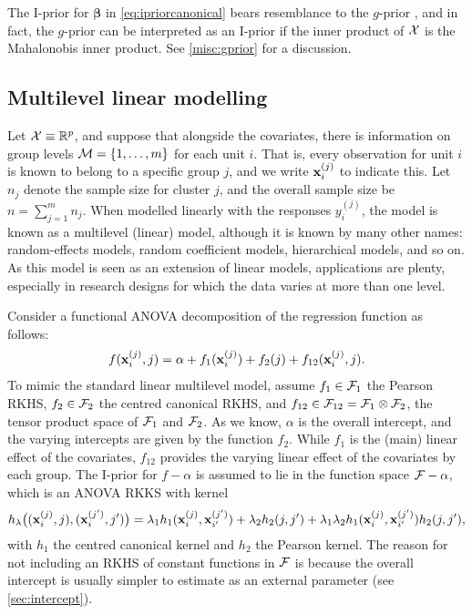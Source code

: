 \begin{remark}
  The I-prior for $\boldsymbol{\beta}$ in \cref{eq:ipriorcanonical} bears resemblance to the $g$-prior \citep{zellner1986assessing}, and in fact, the $g$-prior can be interpreted as an I-prior if the inner product of ${\mathcal X}$ is the Mahalonobis inner product.
  See \cref{misc:gprior}  for a discussion.
\end{remark}

\subsection{Multilevel linear modelling}
\label{sec:multilevelmodels}

Let ${\mathcal X}\equiv\mathbb{R}^p$, and suppose that alongside the covariates, there is information on group levels ${\mathcal M}= \{1,\dots,m\}$ for each unit $i$.
That is, every observation for unit $i$ is known to belong to a specific group $j$, and we write ${\mathbf x}_i^{(j)}$ to indicate this.
Let $n_j$ denote the sample size for cluster $j$, and the overall sample size be $n = \sum_{j=1}^m n_j$.
When modelled linearly with the responses $y_i^{(j)}$, the model is known as a multilevel (linear) model, although it is known by many other names: random-effects models, random coefficient models, hierarchical models, and so on.
As this model is seen as an extension of linear models, applications are plenty, especially in research designs for which the data varies at more than one level.

Consider a functional ANOVA decomposition of the regression function as follows:
\begin{align}\label{eq:anovamultilevel}
  f({\mathbf x}_i^{(j)}, j) = \alpha + f_1({\mathbf x}_i^{(j)}) + f_2(j) + f_{12}({\mathbf x}_i^{(j)}, j).  
\end{align}
To mimic the standard linear multilevel model, assume $f_1\in{\mathcal F}_1$ the Pearson RKHS, $f_2\in{\mathcal F}_2$ the centred canonical RKHS, and $f_{12} \in {\mathcal F}_{12} = {\mathcal F}_1 \otimes {\mathcal F}_2$, the tensor product space of ${\mathcal F}_1$ and ${\mathcal F}_2$.
As we know, $\alpha$ is the overall intercept, and the varying intercepts are given by the function $f_2$.
While $f_1$ is the (main) linear effect of the covariates, $f_{12}$ provides the varying linear effect of the covariates by each group.
The I-prior for $f-\alpha$ is assumed to lie in the function space ${\mathcal F}-\alpha$, which is an ANOVA RKKS with kernel
\[
  h_\lambda\big(({\mathbf x}_i^{(j)},j),({\mathbf x}_i^{(j')},j')\big) = \lambda_1 h_1({\mathbf x}_i^{(j)},{\mathbf x}_{i'}^{(j')}) + \lambda_2 h_2(j,j') + \lambda_1\lambda_2 h_1({\mathbf x}_i^{(j)},{\mathbf x}_{i'}^{(j')})h_2(j,j'),
\]
with $h_1$ the centred canonical kernel and $h_2$ the Pearson kernel.
The reason for not including an RKHS of constant functions in ${\mathcal F}$ is because the overall intercept is usually simpler to estimate as an external parameter (see \cref{sec:intercept}).

